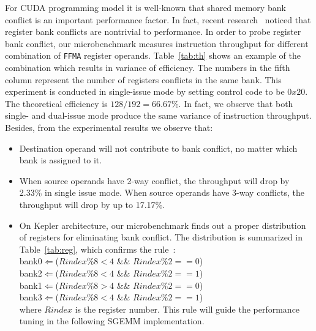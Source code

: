 For CUDA programming model it is well-known that shared memory bank conflict is an important performance factor. In
fact, recent research~\cite{lai} noticed that register bank conflicts are nontrivial to performance.  In order to probe register bank conflict, our microbenchmark measures instruction throughput for different combination of {\tt FFMA} register operands. Table~\ref{tab:th} shows an example of the combination which results in variance of efficiency. The numbers in the fifth column represent the number of registers conflicts in the same bank. This experiment is conducted in single-issue mode by setting control code to be $0x20$. The theoretical efficiency is $128/192=66.67\%$. In fact, we observe that both single- and dual-issue mode produce the same variance of instruction throughput. Besides, from the experimental results we observe that:
\begin{itemize}
\item Destination operand will not contribute to bank conflict, no matter which bank is assigned to it.
\item When source operands have 2-way conflict, the throughput will drop by 2.33\% in single issue
    mode. When source operands have 3-way conflicts, the throughput will drop by up to 17.17\%.

 \item On Kepler architecture, our microbenchmark finds out a proper distribution of registers for eliminating bank
     conflict. The distribution is summarized in Table~\ref{tab:reg}, which confirms the rule~\cite{lai}: \\
 bank0$\Leftarrow$($Rindex \% 8 < 4$ \&\& $Rindex \% 2 == 0$) \\
 bank2$\Leftarrow$($Rindex \% 8 < 4$ \&\&
$Rindex \% 2 == 1$) \\
bank1$\Leftarrow$($Rindex \% 8 > 4$ \&\& $Rindex \%2 == 0$) \\
bank3$\Leftarrow$($Rindex \% 8 < 4$ \&\&
$Rindex\% 2 == 1$)\\
where $Rindex$ is the register number. This rule will guide the performance tuning in the following SGEMM implementation.

\end{itemize}

